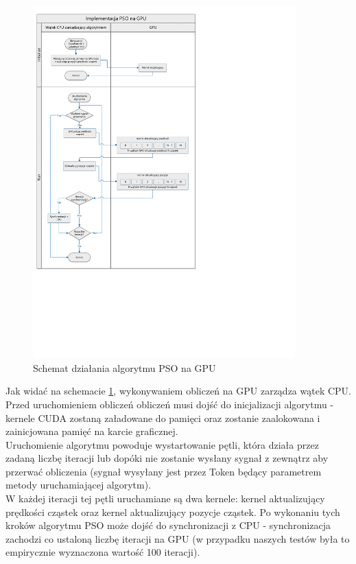 \documentclass[12pt, twoside, openany, abstract=on]{report}
\theoremstyle{definition}
\begin{document}
\newpage

\begin{figure}[H]
    \centering
 \includegraphics[width=0.9\textwidth, clip, trim=0.0cm 10cm 11cm 0cm]{gpu_diagram.pdf}
 \caption{Schemat działania algorytmu PSO na GPU}
 \label{fig:gpu}
\end{figure}

  
Jak widać na schemacie \ref{fig:gpu}, wykonywaniem obliczeń na GPU zarządza wątek CPU. \\ 
Przed uruchomieniem obliczeń obliczeń musi dojść do inicjalizacji algorytmu - kernele CUDA zostaną załadowane do pamięci oraz zostanie zaalokowana i zainicjowana pamięć na karcie graficznej. \\
Uruchomienie algorytmu powoduje wystartowanie pętli, która działa przez zadaną liczbę iteracji lub dopóki nie zostanie wysłany sygnał z zewnątrz aby przerwać obliczenia (sygnał wysyłany jest przez Token będący parametrem metody uruchamiającej algorytm). \\
W każdej iteracji tej pętli uruchamiane są dwa kernele: kernel aktualizujący prędkości cząstek oraz kernel aktualizujący pozycje cząstek. Po wykonaniu tych kroków algorytmu PSO może dojść do synchronizacji z CPU - synchronizacja zachodzi co ustaloną liczbę iteracji na GPU (w przypadku naszych testów była to empirycznie wyznaczona wartość 100 iteracji).
\end{document}
